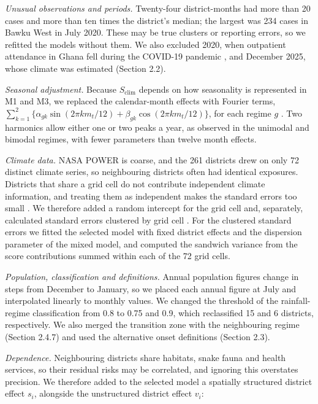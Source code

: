\documentclass[11pt,a4paper]{article}
\begin{document}
\emph{Unusual observations and periods.} Twenty-four district-months had more than 20 cases and more than ten times the district's median; the largest was 234 cases in Bawku West in July 2020. These may be true clusters or reporting errors, so we refitted the models without them. We also excluded 2020, when outpatient attendance in Ghana fell during the COVID-19 pandemic \cite{ref31}, and December 2025, whose climate was estimated (Section 2.2).

\emph{Seasonal adjustment.} Because \(S_{\text{clim}}\) depends on how seasonality is represented in M1 and M3, we replaced the calendar-month effects with Fourier terms, \(\sum_{k=1}^{2}\lbrace \alpha_{gk}\sin(2\pi k m_t/12) + \beta_{gk}\cos(2\pi k m_t/12)\rbrace\), for each regime \(g\) \cite{ref30}. Two harmonics allow either one or two peaks a year, as observed in the unimodal and bimodal regimes, with fewer parameters than twelve month effects.

\emph{Climate data.} NASA POWER is coarse, and the 261 districts drew on only 72 distinct climate series, so neighbouring districts often had identical exposures. Districts that share a grid cell do not contribute independent climate information, and treating them as independent makes the standard errors too small \cite{ref73}. We therefore added a random intercept for the grid cell and, separately, calculated standard errors clustered by grid cell \cite{ref73}. For the clustered standard errors we fitted the selected model with fixed district effects and the dispersion parameter of the mixed model, and computed the sandwich variance from the score contributions summed within each of the 72 grid cells.

\emph{Population, classification and definitions.} Annual population figures change in steps from December to January, so we placed each annual figure at July and interpolated linearly to monthly values. We changed the threshold of the rainfall-regime classification from 0.8 to 0.75 and 0.9, which reclassified 15 and 6 districts, respectively. We also merged the transition zone with the neighbouring regime (Section 2.4.7) and used the alternative onset definitions (Section 2.3).

\emph{Dependence.} Neighbouring districts share habitats, snake fauna and health services, so their residual risks may be correlated, and ignoring this overstates precision. We therefore added to the selected model a spatially structured district effect \(s_i\), alongside the unstructured district effect \(v_i\):
\end{document}
